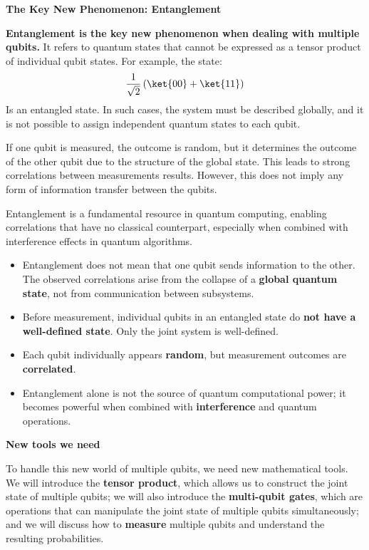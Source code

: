 \highspace
\begin{flushleft}
    \textcolor{Green3}{ \textbf{The Key New Phenomenon: Entanglement}}
\end{flushleft}
\textbf{Entanglement is the key new phenomenon when dealing with multiple qubits.} It refers to quantum states that cannot be expressed as a tensor product of individual qubit states. For example, the state:
\begin{equation*}
    \dfrac{1}{\sqrt{2}} \left( \ket{00} + \ket{11} \right)
\end{equation*}
Is an entangled state. In such cases, the system must be described globally, and it is not possible to assign independent quantum states to each qubit.

\highspace
If one qubit is measured, the outcome is random, but it determines the outcome of the other qubit due to the structure of the global state. This leads to strong correlations between measurements results. However, this does not imply any form of information transfer between the qubits.

\highspace
Entanglement is a fundamental resource in quantum computing, enabling correlations that have no classical counterpart, especially when combined with interference effects in quantum algorithms.
\begin{itemize}
    \item Entanglement does not mean that one qubit sends information to the other. The observed correlations arise from the collapse of a \textbf{global quantum state}, not from communication between subsystems.
    
    \item Before measurement, individual qubits in an entangled state do \textbf{not have a well-defined state}. Only the joint system is well-defined.
    
    \item Each qubit individually appears \textbf{random}, but measurement outcomes are \textbf{correlated}.
    
    \item Entanglement alone is not the source of quantum computational power; it becomes powerful when combined with \textbf{interference} and quantum operations.
\end{itemize}

\highspace
\begin{flushleft}
    \textcolor{Green3}{ \textbf{New tools we need}}
\end{flushleft}
To handle this new world of multiple qubits, we need new mathematical tools. We will introduce the \textbf{tensor product}, which allows us to construct the joint state of multiple qubits; we will also introduce the \textbf{multi-qubit gates}, which are operations that can manipulate the joint state of multiple qubits simultaneously; and we will discuss how to \textbf{measure} multiple qubits and understand the resulting probabilities.